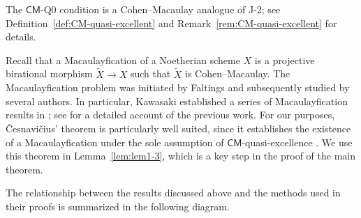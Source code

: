\documentclass[a4paper, 11pt]{amsart}
\theoremstyle{definition}
\begin{document}
The $\mathsf{CM}$-Q0 condition is a Cohen--Macaulay analogue of J-2; see Definition~\ref{def:CM-quasi-excellent} and Remark~\ref{rem:CM-quasi-excellent} for details.

Recall that a Macaulayfication of a Noetherian scheme $X$ is a projective birational morphism $\widetilde{X} \to X$ such that $\widetilde{X}$ is Cohen--Macaulay. The Macaulayfication problem was initiated by Faltings and subsequently studied by several authors. In particular, Kawasaki established a series of Macaulayfication results in \cite{Kaw98,Kaw00,Kaw02,Kaw08}; see \cite[\S~1.12]{Ces21} for a detailed account of the previous work. For our purposes, \v{C}esnavi\v{c}ius' theorem is particularly well suited, since it establishes the existence of a Macaulayfication under the sole assumption of $\mathsf{CM}$-quasi-excellence \cite[Theorem~1.6]{Ces21}. We use this theorem in Lemma~\ref{lem:lem1-3}, which is a key step in the proof of the main theorem.

The relationship between the results discussed above and the methods used in their proofs is summarized in the following diagram.
\end{document}
